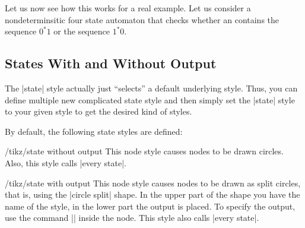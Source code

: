 Let us now see how this works for a real example. Let us consider a
nondeterminsitic four state automaton that checks whether an contains
the sequence $0^*1$ or the sequence $1^*0$. 
\begin{codeexample}[]
\end{codeexample}


\subsection{States With and Without Output}

The |state| style actually just ``selects'' a default underlying
style. Thus, you can define multiple new complicated state style and
then simply set the |state| style to your given style to get the
desired kind of styles.

By default, the following state styles are defined:
\begin{stylekey}{/tikz/state without output}
  This node style causes nodes to be drawn circles. Also, this style
  calls |every state|.
\end{stylekey}

\begin{stylekey}{/tikz/state with output}
  This node style causes nodes to be drawn as split circles, that is,
  using the |circle split| shape. In the upper part of the shape you
  have the name of the style, in the lower part the output is
  placed. To specify the output, use the command ||
  inside the node. This style also calls |every state|.
\begin{codeexample}[]
\end{codeexample}
\end{stylekey}

